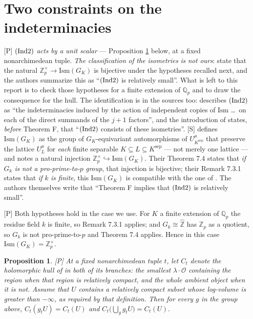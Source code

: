 \documentclass[11pt]{article}
\theoremstyle{plain}
\newtheorem{proposition}{Proposition}
\theoremstyle{definition}
\newcommand{\Ind}[1]{\textup{(Ind#1)}}
\begin{document}
\section{Two constraints on the indeterminacies}\label{s:indets}

\textup{[P]} \emph{$\Ind2$ acts by a unit scalar} --- Proposition \ref{p:ind2hull}
below, at a fixed nonarchimedean tuple.  \emph{The classification of the isometries is
not ours}: \cite[Thm.~F, and Thm.~7.4]{MT} state that the natural
$\mathbb Z_p^{\times}\to\mathrm{Ism}(G_K)$ is bijective under the hypotheses recalled
next, and the authors summarize this as ``$\Ind2$ is relatively small''.  What is left
to this report is to check those hypotheses for a finite extension of $\mathbb Q_p$ and
to draw the consequence for the hull.  The identification is in the sources too:
\cite[Thm.~3.11(i)]{IUT3} describes $\Ind2$ as ``the indeterminacies induced by the
action of independent copies of $\mathrm{Ism}$ \dots\ on each of the direct summands of
the $j+1$ factors'', and the introduction of \cite{MT} states, \emph{before} Theorem F,
that ``$\Ind2$ consists of these isometries''.  \textup{[S]} \cite[Def.~7.3]{MT} defines
$\mathrm{Ism}(G_K)$ as the group of $G_K$-equivariant automorphisms of
$U_{K^{\mathrm{sep}}}^{\mu}$ that preserve the lattice $U_L^{\mu}$ for
\emph{each} finite separable $K\subseteq L\subseteq K^{\mathrm{sep}}$ --- not merely
one lattice --- and notes a natural injection
$\mathbb{Z}_p^{\times}\hookrightarrow\mathrm{Ism}(G_K)$.  Their Theorem 7.4 states
that \emph{if $G_k$ is not a pro-prime-to-$p$ group}, that injection is bijective;
their Remark 7.3.1 states that \emph{if $k$ is finite}, this $\mathrm{Ism}(G_K)$
is compatible with the one of \cite[Ex.~1.8(iv)]{IUT2}.  The authors themselves write that
``Theorem F implies that $\Ind2$ is relatively small''.

\textup{[P]} Both hypotheses hold in the case we use.  For $K$ a finite extension of
$\mathbb{Q}_p$ the residue field $k$ is finite, so Remark 7.3.1 applies; and
$G_k\cong\widehat{\mathbb{Z}}$ has $\mathbb{Z}_p$ as a quotient, so $G_k$ is not
pro-prime-to-$p$ and Theorem 7.4 applies.  Hence in this case
$\mathrm{Ism}(G_K)=\mathbb{Z}_p^{\times}$.

\begin{proposition}\label{p:ind2hull}
\textup{[P]} At a fixed \emph{nonarchimedean} tuple $t$, let $C_t$ denote the
holomorphic hull of \cite[Rem.~3.9.5(i)]{IUT3} in \emph{both} of its branches: the
smallest $\lambda\cdot\mathcal O$ containing the region when that region is relatively
compact, and the whole ambient object when it is not.  Assume that $U$ contains a
relatively compact subset whose log-volume is greater than $-\infty$, as required
by that definition.  Then for every $g$ in the group
above, $C_t(g_tU)=C_t(U)$ and $C_t\bigl(\bigcup_g g_tU\bigr)=C_t(U)$.
\end{proposition}
\end{document}
